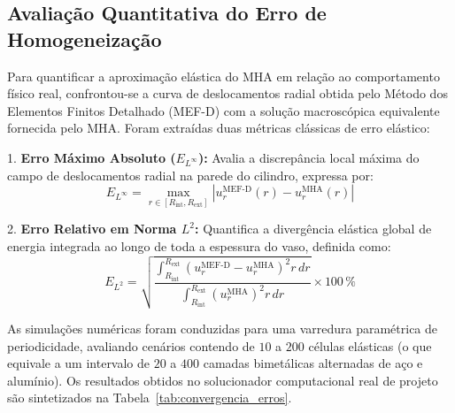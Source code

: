 \subsection{Avaliação Quantitativa do Erro de Homogeneização}

Para quantificar a aproximação elástica do MHA em relação ao comportamento físico real, confrontou-se a curva de deslocamentos radial obtida pelo Método dos Elementos Finitos Detalhado (MEF-D) com a solução macroscópica equivalente fornecida pelo MHA. Foram extraídas duas métricas clássicas de erro elástico:

1. \textbf{Erro Máximo Absoluto ($E_{L^\infty}$):} Avalia a discrepância local máxima do campo de deslocamentos radial na parede do cilindro, expressa por:
\begin{equation}
  E_{L^\infty} = \max_{r \in [R_{\text{int}}, R_{\text{ext}}]} |u_r^{\text{MEF-D}}(r) - u_r^{\text{MHA}}(r)|
  \label{eq:erro_linf}
\end{equation}

2. \textbf{Erro Relativo em Norma $L^2$:} Quantifica a divergência elástica global de energia integrada ao longo de toda a espessura do vaso, definida como:
\begin{equation}
  E_{L^2} = \sqrt{\frac{\int_{R_{\text{int}}}^{R_{\text{ext}}} (u_r^{\text{MEF-D}} - u_r^{\text{MHA}})^2 r \, d r}{\int_{R_{\text{int}}}^{R_{\text{ext}}} (u_r^{\text{MHA}})^2 r \, d r}} \times 100 \, \%
  \label{eq:erro_l2}
\end{equation}

As simulações numéricas foram conduzidas para uma varredura paramétrica de periodicidade, avaliando cenários contendo de $10$ a $200$ células elásticas (o que equivale a um intervalo de $20$ a $400$ camadas bimetálicas alternadas de aço e alumínio). Os resultados obtidos no solucionador computacional real de projeto são sintetizados na Tabela~\ref{tab:convergencia_erros}.

